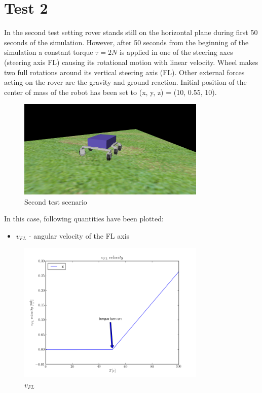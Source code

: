 \newpage
\section{Test 2}
\label{Sec:test_2}

In the second test setting rover stands still on the horizontal plane during first 50 seconds of the simulation.
However, after 50 seconds from the beginning of the simulation a constant torque $\tau = 2N$ is applied in one of the steering axes (steering axis FL)
causing its rotational motion with linear velocity. Wheel makes two full rotations around its vertical steering axis (FL). 
Other external forces acting on the rover are the gravity and ground reaction. Initial position of the center of mass of the robot
has been set to (x, y, z) = (10, 0.55, 10). 

\begin{figure}[H]
  \centering
    \includegraphics[width=0.8\textwidth]{run_2}
  \caption{Second test scenario}
\end{figure}

\noindent In this case, following quantities have been plotted:

\begin{itemize}
  \item $v_{FL}$ - angular velocity of the FL axis
\end{itemize}

\begin{figure}[H]
  \centering
    \includegraphics[width=0.8\textwidth]{vFL}
  \caption{$v_{FL}$}
\end{figure}

